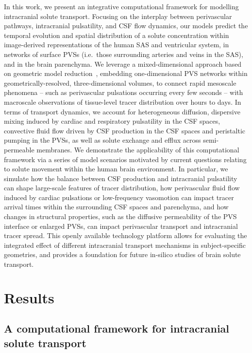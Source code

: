 \documentclass[fleqn,10pt]{wlscirep}
\begin{document}
In this work, we present an integrative computational framework for
modelling intracranial solute transport. Focusing on the interplay
between perivascular pathways, intracranial pulsatility, and CSF flow
dynamics, our models predict the temporal evolution and spatial
distribution of a solute concentration within image-derived
representations of the human SAS and ventricular system, in networks
of surface PVSs (i.e.~those surrounding arteries and veins in the
SAS), and in the brain parenchyma. We leverage a mixed-dimensional
approach based on geometric model reduction~\cite{masri2024modelling},
embedding one-dimensional PVS networks within geometrically-resolved,
three-dimensional volumes, to connect rapid mesoscale phenomena --
such as perivascular pulsations occurring every few seconds -- with
macroscale observations of tissue-level tracer distribution over hours
to days. In terms of transport dynamics, we account for heterogeneous
diffusion, dispersive mixing induced by cardiac and respiratory
pulsatility in the CSF spaces, convective fluid flow driven by CSF
production in the CSF spaces and peristaltic pumping in the PVSs, as
well as solute exchange and efflux across semi-permeable membranes. We
demonstrate the applicability of this computational framework via a
series of model scenarios motivated by current questions relating to
solute movement within the human brain environment. In particular,
we simulate how the balance between CSF production and intracranial
pulsatility can shape large-scale features of tracer distribution, how
perivascular fluid flow induced by cardiac pulsations or low-frequency
vasomotion can impact tracer arrival times within the surrounding CSF
spaces and parenchyma, and how changes in structural properties, such
as the diffusive permeability of the PVS interface or enlarged PVSs,
can impact perivascular transport and intracranial tracer spread. This
openly available technology platform\cite{ZENODO} allows for
evaluating the integrated effect of different intracranial transport
mechanisms in subject-specific geometries, and provides a foundation
for future in-silico studies of brain solute transport.

\section*{Results}

\subsection*{A computational framework for intracranial solute transport}
\end{document}
